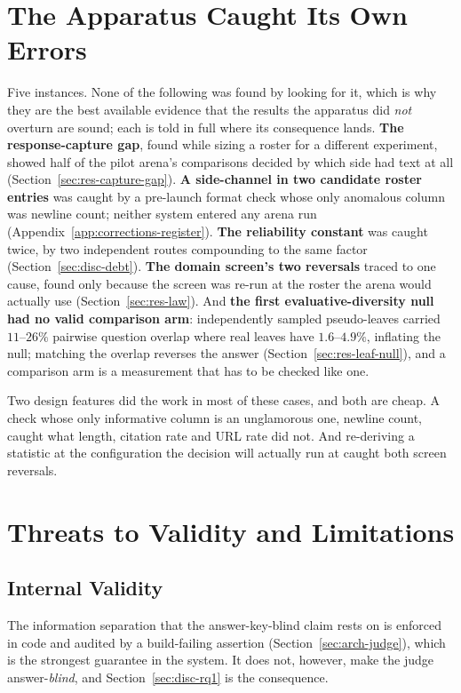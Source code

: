 \section{The Apparatus Caught Its Own Errors}\label{sec:disc-selfcheck}

Five instances. None of the following was found by
looking for it, which is why they are the best available evidence that
the results the apparatus did \emph{not} overturn are sound; each is
told in full where its consequence lands. \textbf{The response-capture
gap}, found while sizing a roster for a different experiment, showed
half of the pilot arena's comparisons decided by which side had text
at all (Section~\ref{sec:res-capture-gap}). \textbf{A side-channel in
two candidate roster entries} was caught by a pre-launch format check
whose only anomalous column was newline count; neither system entered
any arena run (Appendix~\ref{app:corrections-register}). \textbf{The
reliability constant} was caught twice, by two independent routes
compounding to the same factor (Section~\ref{sec:disc-debt}).
\textbf{The domain screen's two reversals} traced to one cause, found
only because the screen was re-run at the roster the arena would
actually use (Section~\ref{sec:res-law}). And \textbf{the first
evaluative-diversity null had no valid comparison arm}: independently
sampled pseudo-leaves carried $11$--$26\%$ pairwise question overlap
where real leaves have $1.6$--$4.9\%$, inflating the null; matching
the overlap reverses the answer (Section~\ref{sec:res-leaf-null}), and
a comparison arm is a measurement that has to be checked like one.

Two design features did the work in most of these cases, and both are
cheap. A check whose only informative column is an unglamorous one,
newline count, caught what length, citation rate and URL rate did not.
And re-deriving a statistic at the configuration the decision will
actually run at caught both screen reversals.

\section{Threats to Validity and Limitations}\label{sec:disc-validity}

\subsection{Internal Validity}\label{subsec:disc-internal-validity}

The information separation that the answer-key-blind claim rests on is
enforced in code and audited by a build-failing assertion
(Section~\ref{sec:arch-judge}), which is the strongest guarantee in the
system. It does not, however, make the judge answer-\emph{blind}, and
Section~\ref{sec:disc-rq1} is the consequence.

